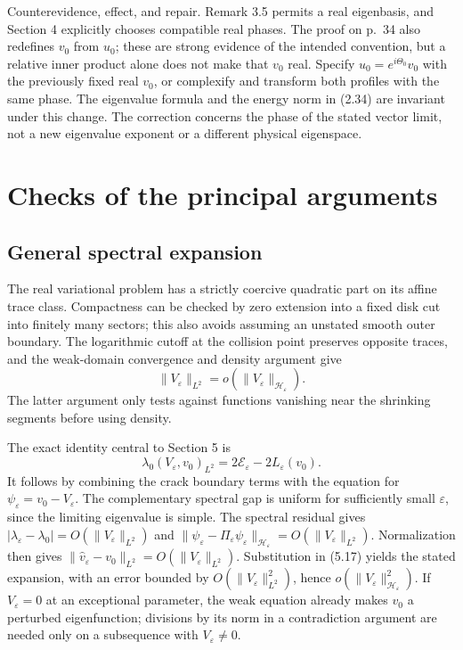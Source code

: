 \documentclass[10pt]{article}
\begin{document}
Counterevidence, effect, and repair. Remark 3.5 permits a real eigenbasis, and Section 4 explicitly chooses compatible real phases. The proof on p. 34 also redefines \(v_0\) from \(u_0\); these are strong evidence of the intended convention, but a relative inner product alone does not make that \(v_0\) real. Specify \(u_0=e^{i\Theta_0}v_0\) with the previously fixed real \(v_0\), or complexify and transform both profiles with the same phase. The eigenvalue formula and the energy norm in (2.34) are invariant under this change. The correction concerns the phase of the stated vector limit, not a new eigenvalue exponent or a different physical eigenspace.\par
\section*{Checks of the principal arguments}
\subsection*{General spectral expansion}
The real variational problem has a strictly coercive quadratic part on its affine trace class. Compactness can be checked by zero extension into a fixed disk cut into finitely many sectors; this also avoids assuming an unstated smooth outer boundary. The logarithmic cutoff at the collision point preserves opposite traces, and the weak-domain convergence and density argument give \[\|V_\varepsilon\|_{L^2}=o(\|V_\varepsilon\|_{\mathcal H_\varepsilon}).\] The latter argument only tests against functions vanishing near the shrinking segments before using density.\par
The exact identity central to Section 5 is \[\lambda_0(V_\varepsilon,v_0)_{L^2}
      =2\mathcal E_\varepsilon-2L_\varepsilon(v_0).\] It follows by combining the crack boundary terms with the equation for \(\psi_\varepsilon=v_0-V_\varepsilon\). The complementary spectral gap is uniform for sufficiently small \(\varepsilon\), since the limiting eigenvalue is simple. The spectral residual gives \(|\lambda_\varepsilon-\lambda_0|=O(\|V_\varepsilon\|_{L^2})\) and \(\|\psi_\varepsilon-\Pi_\varepsilon\psi_\varepsilon\|_{\mathcal H_\varepsilon}
 =O(\|V_\varepsilon\|_{L^2})\). Normalization then gives \(\|\widehat v_\varepsilon-v_0\|_{L^2}=O(\|V_\varepsilon\|_{L^2})\). Substitution in (5.17) yields the stated expansion, with an error bounded by \(O(\|V_\varepsilon\|_{L^2}^2)\), hence \(o(\|V_\varepsilon\|_{\mathcal H_\varepsilon}^2)\). If \(V_\varepsilon=0\) at an exceptional parameter, the weak equation already makes \(v_0\) a perturbed eigenfunction; divisions by its norm in a contradiction argument are needed only on a subsequence with \(V_\varepsilon\ne0\).\par
\end{document}
